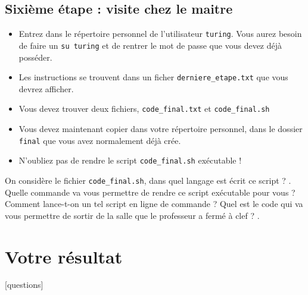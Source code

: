 \documentclass[a4paper,10pt,addpoints]{exam}
\begin{document}
\begin{questions}
\subsection{Sixième étape : visite chez le maitre}
\begin{itemize}[label=$\leadsto$, font=\LARGE \color{blue}]
	\item Entrez dans le répertoire personnel de l'utilisateur \verb|turing|. Vous aurez besoin de faire un \verb|su turing| et de rentrer le mot de passe que vous devez déjà posséder.
	\item Les instructions se trouvent dans un ficher \verb|derniere_etape.txt| que vous devrez afficher.
	\item Vous devez trouver deux fichiers, \verb|code_final.txt| et \verb|code_final.sh|
	\item Vous devez maintenant copier dans votre répertoire personnel, dans le dossier \verb|final| que vous avez normalement déjà crée.
	\item N'oubliez pas de rendre le script \verb|code_final.sh| exécutable !
\end{itemize}
\question [1] On considère le fichier \verb|code_final.sh|, dans quel langage est écrit ce script ?
\answerline.
\question [1] Quelle commande va vous permettre de rendre ce script exécutable pour vous ?
\answerline
\question [1] Comment lance-t-on un tel script en ligne de commande ?
\answerline
\question  [2] Quel est le code qui va vous permettre de sortir de la salle que le professeur a fermé à clef ?
\answerline.

\section{Votre résultat}
\begin{center}
	[questions]
\end{center}

	\end{questions}
\end{document}
